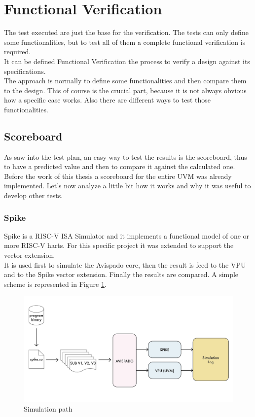 \section{Functional Verification}
The test executed are just the base for the verification. The tests can only define some functionalities, but to test all of them a complete functional verification is required.\\
It can be defined Functional Verification the process to verify a design against its specifications.\\

The approach is normally to define some functionalities and then compare them to the design. This of course is the crucial part, because it is not always obvious how a specific case works. Also there are different ways to test those functionalities.\\

\subsection{Scoreboard}
As saw into the test plan, an easy way to test the results is the scoreboard, thus to have a predicted value and then to compare it against the calculated one.\\

Before the work of this thesis a scoreboard for the entire UVM was already implemented. Let's now analyze a little bit how it works and why it was useful to develop other tests.

\subsubsection{Spike}
Spike is a RISC-V ISA Simulator and it implements a functional model of one or more RISC-V harts. For this specific project it was extended to support the vector extension.\\
It is used first to simulate the Avispado core, then the result is feed to the VPU and to the Spike vector extension. Finally the results are compared. A simple scheme is represented in Figure \ref{bin-to-log}. \\

\begin{figure}[H]
    \centering
    \includegraphics[scale = 0.5]{Chapter_2/img/bin-to-log.png}
    \caption{Simulation path}
    \label{bin-to-log}
\end{figure}

